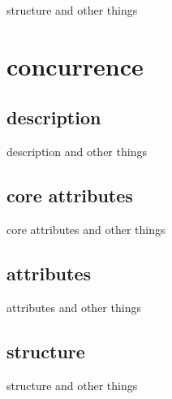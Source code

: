 structure and other things




\section{concurrence}

    \subsection{description}

description and other things

    \subsection{core attributes}

core attributes and other things

    \subsection{attributes}

attributes and other things

    \subsection{structure}

structure and other things

